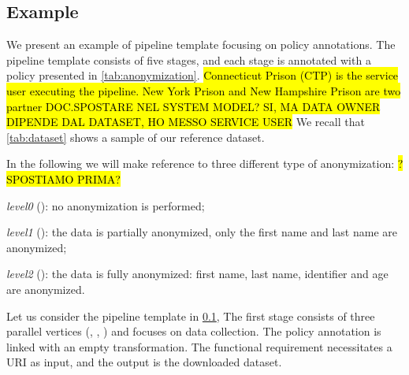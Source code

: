 \subsection{Example}\label{sec:example}
\newcommand{\pone}{$\langle service\_owner=dataset\_owner\rangle$}
\newcommand{\ptwo}{$\langle service\_owner=partner(dataset\_owner) \rangle$}
\newcommand{\pthree}{$\langle service\_owner \neq dataset\_owner AND owner \neq partner(dataset\_owner)$}


We present an example of pipeline template focusing on policy annotations. The pipeline template consists of five stages, and each stage is annotated with a policy presented in \cref{tab:anonymization}. \hl{Connecticut Prison (CTP) is the service user executing the pipeline. New York Prison and New Hampshire Prison are two partner DOC.}\hl{SPOSTARE NEL SYSTEM MODEL? SI, MA DATA OWNER DIPENDE DAL DATASET, HO MESSO SERVICE USER} We recall that \cref{tab:dataset} shows a sample of our reference dataset.

In the following we will make reference to three different type of anonymization:%
\hl{? SPOSTIAMO PRIMA?}
\begin{enumerate*}[label=\roman*)]
  \item \emph{level0} (): no anonymization is performed;
  \item \emph{level1} (): the data is partially anonymized, only the first name and last name are anonymized;
  \item \emph{level2} (): the data is fully anonymized: first name, last name, identifier and age are anonymized.
\end{enumerate*}

Let us consider the pipeline template \tChartFunction in \cref{sec:example},
The first stage consists of three parallel vertices (, , ) and focuses on data collection.
The policy annotation  is linked with an empty transformation.
The functional requirement necessitates a URI as input, and the output is the downloaded dataset.

